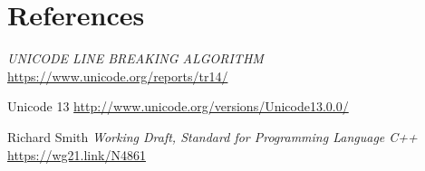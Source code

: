 \documentclass{wg21}
\begin{document}
\section{References}
\renewcommand{\section}[2]{}%



\begin{thebibliography}{9}
    
\emph{UNICODE LINE BREAKING ALGORITHM}\newline
\url{https://www.unicode.org/reports/tr14/}

Unicode 13\newline
\url{http://www.unicode.org/versions/Unicode13.0.0/}

Richard Smith
\emph{Working Draft, Standard for Programming Language C++}\newline
\url{https://wg21.link/N4861}

\end{thebibliography}
\end{document}
